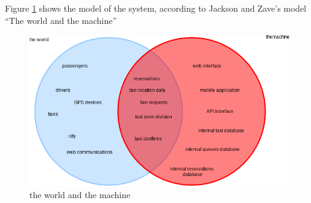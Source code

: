 Figure \ref{fig:world_and_machine} shows the model of the system, according to Jackson and Zave's model ``The world and the machine''

\begin{figure} [ht]
  \centering
  \includegraphics[scale=0.6]{../../notes/world and machine diagram.png}
  \caption{\label{fig:world_and_machine} the world and the machine}
\end{figure}


